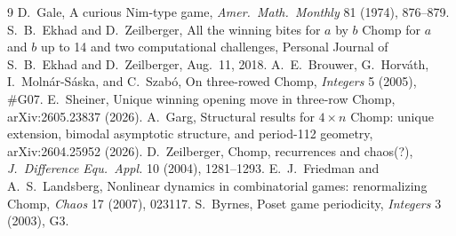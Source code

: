 \documentclass[11pt]{article}
\begin{document}
\begin{thebibliography}{9}
 D.~Gale, A curious Nim-type game, \emph{Amer.\ Math.\ Monthly} 81 (1974), 876--879.
 S.~B.~Ekhad and D.~Zeilberger, All the winning bites for $a$ by $b$ Chomp for $a$ and $b$ up to 14 and two computational challenges, Personal Journal of S.~B.~Ekhad and D.~Zeilberger, Aug.~11, 2018.
 A.~E.~Brouwer, G.~Horv\'ath, I.~Moln\'ar-S\'aska, and C.~Szab\'o, On three-rowed Chomp, \emph{Integers} 5 (2005), \#G07.
 E.~Sheiner, Unique winning opening move in three-row Chomp, arXiv:2605.23837 (2026).
 A.~Garg, Structural results for $4\times n$ Chomp: unique extension, bimodal asymptotic structure, and period-112 geometry, arXiv:2604.25952 (2026).
 D.~Zeilberger, Chomp, recurrences and chaos(?), \emph{J.\ Difference Equ.\ Appl.} 10 (2004), 1281--1293.
 E.~J.~Friedman and A.~S.~Landsberg, Nonlinear dynamics in combinatorial games: renormalizing Chomp, \emph{Chaos} 17 (2007), 023117.
 S.~Byrnes, Poset game periodicity, \emph{Integers} 3 (2003), G3.
\end{thebibliography}
\end{document}
